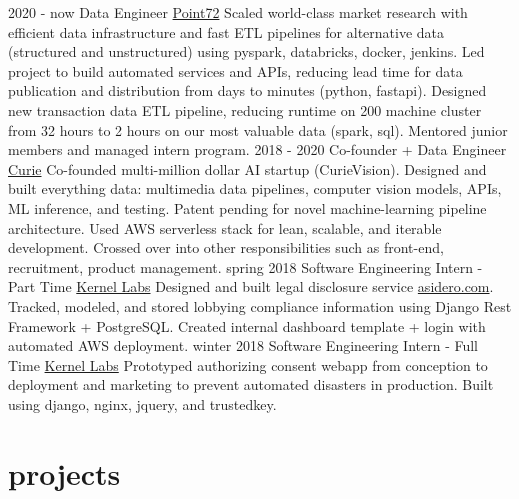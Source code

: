 \documentclass[]{friggeri-cv}
\begin{document}
\begin{entrylist}
  \entry
    {2020 - now}
    {Data Engineer}
    {\href{https://www.point72.com/}{Point72}}
    {
      Scaled world-class market research with efficient data infrastructure and fast ETL pipelines for alternative data (structured and unstructured) using pyspark, databricks, docker, jenkins.
Led project to build automated services and APIs, reducing lead time for data publication and distribution from days to minutes (python, fastapi).
Designed new transaction data ETL pipeline, reducing runtime on 200 machine cluster from 32 hours to 2 hours on our most valuable data (spark, sql).
Mentored junior members and managed intern program.
    }
  \entry
    {2018 - 2020}
    {Co-founder + Data Engineer}
    {\href{http://www.curie.co/}{Curie}}
    {Co-founded multi-million dollar AI startup (CurieVision). Designed and built everything data: multimedia data pipelines, computer vision models, APIs, ML inference, and testing. Patent pending for novel machine-learning pipeline architecture. Used AWS serverless stack for lean, scalable, and iterable development. Crossed over into other responsibilities such as front-end, recruitment, product management.} 
  \entry
    {spring 2018}
    {Software Engineering Intern - Part Time}
    {\href{http://www.kernellabs.io/}{Kernel Labs}}
    {Designed and built legal disclosure service \href{https://asidero.com}{asidero.com}. Tracked, modeled, and stored lobbying compliance information using Django Rest Framework + PostgreSQL. Created internal dashboard template + login with automated AWS deployment.}
  \entry
    {winter 2018}
    {Software Engineering Intern - Full Time}
    {\href{http://www.kernellabs.io/}{Kernel Labs}}
    {Prototyped authorizing consent webapp from conception to deployment and marketing to prevent automated disasters in production. Built using django, nginx, jquery, and trustedkey.}
\end{entrylist}

\section{projects}
\end{document}
